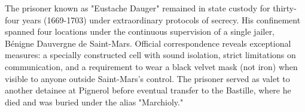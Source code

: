The prisoner known as "Eustache Dauger" remained in state custody for thirty-four years (1669-1703) under extraordinary protocols of secrecy. His confinement spanned four locations under the continuous supervision of a single jailer, Bénigne Dauvergne de Saint-Mars. Official correspondence reveals exceptional measures: a specially constructed cell with sound isolation, strict limitations on communication, and a requirement to wear a black velvet mask (not iron) when visible to anyone outside Saint-Mars's control. The prisoner served as valet to another detainee at Pignerol before eventual transfer to the Bastille, where he died and was buried under the alias "Marchioly."